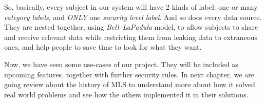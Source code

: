 So, basically, every subject in our system will have 2 kinds of label:
one or many \emph{category labels}, 
and \emph{ONLY} one \emph{security level label}.
And so does every data source.
They are nested together, using \emph{Bell--LaPadula} model,
to allow subjects to share and receive relevant data while restricting them from leaking data to extraneous ones,
and help people to save time to look for what they want.

Now, we have seen some use-cases of our project. 
They will be included as upcoming features, together with further security rules. 
In next chapter, we are going review about the history of MLS to understand more about how it solved real world problems and see how the others implemented it in their solutions.
